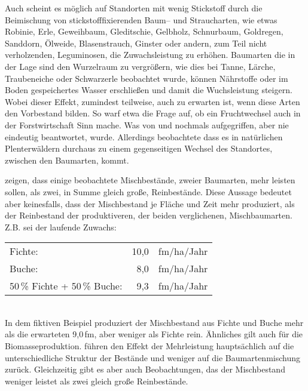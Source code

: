 \documentclass[twocolumn]{scrartcl}
\begin{document}
Auch scheint es möglich auf Standorten mit wenig Stickstoff durch die
Beimischung von stickstofffixierenden Baum-- und Straucharten, wie
etwas Robinie, Erle, Geweihbaum, Gleditschie, Gelbholz, Schnurbaum,
Goldregen, Sanddorn, Ölweide, Blasenstrauch, Ginster oder andern, zum
Teil nicht verholzenden, Leguminosen, die Zuwachsleistung zu
erhöhen. Baumarten die in der Lage sind den Wurzelraum zu vergrößern,
wie dies bei Tanne, Lärche, Traubeneiche oder Schwarzerle
\cite[S.~114, 130, 150, 180]{koestler1969WurzelnDerWaldbaeume}
beobachtet wurde, können Nährstoffe oder im Boden gespeichertes
Wasser erschließen und damit die Wuchsleistung steigern. Wobei dieser
Effekt, zumindest teilweise, auch zu erwarten ist, wenn diese Arten
den Vorbestand bilden. So warf etwa \cite{jentsch1911fruchtwechsel}
die Frage auf, ob ein Fruchtwechsel auch in der Forstwirtschaft Sinn
mache. Was von \cite{sieber1919Holzartenwechsel} und
\cite{fabricius1924Holzartenwechsel} nochmals aufgegriffen, aber nie
eindeutig beantwortet, wurde. Allerdings beobachtete
\cite{simak1951Baumartenwechsel} dass es in natürlichen Plenterwäldern
durchaus zu einem gegenseitigen Wechsel des Standortes, zwischen den
Baumarten, kommt.

\cite{pretzsch2017mischwald} zeigen, dass einige beobachtete
Mischbestände, zweier Baumarten, mehr leisten sollen, als zwei, in
Summe gleich große, Reinbestände. Diese Aussage bedeutet aber
keinesfalls, dass der Mischbestand je Fläche und Zeit mehr produziert,
als der Reinbestand der produktiveren, der beiden verglichenen,
Mischbaumarten.\\
Z.B. sei der laufende Zuwachs:\\
\begin{tabular}{lr@{\,}l}
    Fichte:                      & 10,0 & fm/ha/Jahr\\
    Buche:                       &  8,0 & fm/ha/Jahr\\
    50\,\% Fichte + 50\,\% Buche: &  9,3 & fm/ha/Jahr\\
\end{tabular}\\
In dem fiktiven Beispiel produziert der Mischbestand aus Fichte und
Buche mehr als die erwarteten 9,0\,fm, aber weniger als Fichte
rein. Ähnliches gilt auch für die Biomasseproduktion.
\cite{sterba2018struktur} führen den Effekt der Mehrleistung
hauptsächlich auf die unterschiedliche Struktur der Bestände und
weniger auf die Baumartenmischung zurück. Gleichzeitig gibt es aber
auch Beobachtungen, das der Mischbestand weniger leistet als zwei
gleich große Reinbestände.
\end{document}
